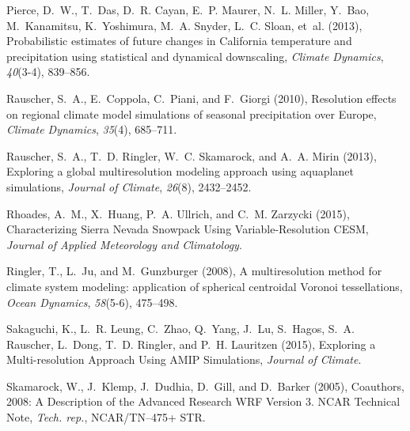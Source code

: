 \documentclass[ms]{agutex}   %
\begin{document}
\begin{article}
\begin{thebibliography}{84}
Pierce, D.~W., T.~Das, D.~R. Cayan, E.~P. Maurer, N.~L. Miller, Y.~Bao,
  M.~Kanamitsu, K.~Yoshimura, M.~A. Snyder, L.~C. Sloan, et~al. (2013),
  {Probabilistic estimates of future changes in California temperature and
  precipitation using statistical and dynamical downscaling}, \textit{Climate
  Dynamics}, \textit{40}(3-4), 839--856.

Rauscher, S.~A., E.~Coppola, C.~Piani, and F.~Giorgi (2010), {Resolution
  effects on regional climate model simulations of seasonal precipitation over
  Europe}, \textit{Climate Dynamics}, \textit{35}(4), 685--711.

Rauscher, S.~A., T.~D. Ringler, W.~C. Skamarock, and A.~A. Mirin (2013),
  {Exploring a global multiresolution modeling approach using aquaplanet
  simulations}, \textit{Journal of Climate}, \textit{26}(8), 2432--2452.

Rhoades, A.~M., X.~Huang, P.~A. Ullrich, and C.~M. Zarzycki (2015),
  {Characterizing Sierra Nevada Snowpack Using Variable-Resolution CESM},
  \textit{Journal of Applied Meteorology and Climatology}.

Ringler, T., L.~Ju, and M.~Gunzburger (2008), {A multiresolution method for
  climate system modeling: application of spherical centroidal Voronoi
  tessellations}, \textit{Ocean Dynamics}, \textit{58}(5-6), 475--498.

Sakaguchi, K., L.~R. Leung, C.~Zhao, Q.~Yang, J.~Lu, S.~Hagos, S.~A. Rauscher,
  L.~Dong, T.~D. Ringler, and P.~H. Lauritzen (2015), {Exploring a
  Multi-resolution Approach Using AMIP Simulations}, \textit{Journal of
  Climate}.

Skamarock, W., J.~Klemp, J.~Dudhia, D.~Gill, and D.~Barker (2005), {Coauthors,
  2008: A Description of the Advanced Research WRF Version 3. NCAR Technical
  Note}, \textit{Tech. rep.}, NCAR/TN--475+ STR.


\end{thebibliography}
\end{article}
\end{document}
